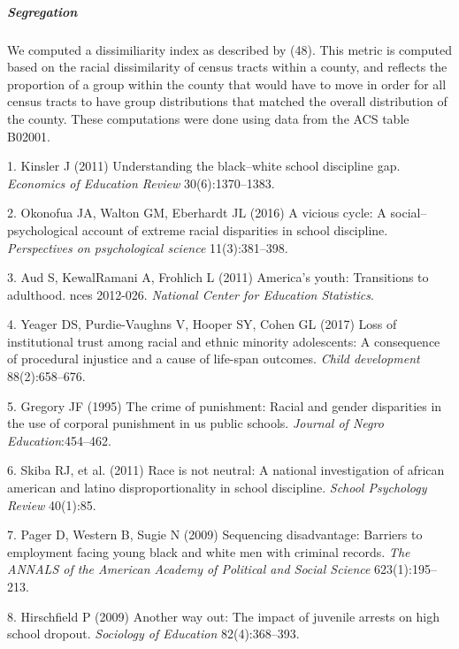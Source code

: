 \documentclass[9pt,twocolumn,twoside,lineno]{pnas-new}
\begin{document}
\subparagraph{Segregation}\label{segregation}

We computed a dissimiliarity index as described by (48). This metric is
computed based on the racial dissimilarity of census tracts within a
county, and reflects the proportion of a group within the county that
would have to move in order for all census tracts to have group
distributions that matched the overall distribution of the county. These
computations were done using data from the ACS table B02001.

\showmatmethods
\showacknow
\pnasbreak

\hypertarget{refs}{}
\hypertarget{ref-kinsler2011understanding}{}
1. Kinsler J (2011) Understanding the black--white school discipline
gap. \emph{Economics of Education Review} 30(6):1370--1383.

\hypertarget{ref-okonofua2016vicious}{}
2. Okonofua JA, Walton GM, Eberhardt JL (2016) A vicious cycle: A
social--psychological account of extreme racial disparities in school
discipline. \emph{Perspectives on psychological science} 11(3):381--398.

\hypertarget{ref-aud2011america}{}
3. Aud S, KewalRamani A, Frohlich L (2011) America's youth: Transitions
to adulthood. nces 2012-026. \emph{National Center for Education
Statistics}.

\hypertarget{ref-yeager2017loss}{}
4. Yeager DS, Purdie-Vaughns V, Hooper SY, Cohen GL (2017) Loss of
institutional trust among racial and ethnic minority adolescents: A
consequence of procedural injustice and a cause of life-span outcomes.
\emph{Child development} 88(2):658--676.

\hypertarget{ref-gregory1995crime}{}
5. Gregory JF (1995) The crime of punishment: Racial and gender
disparities in the use of corporal punishment in us public schools.
\emph{Journal of Negro Education}:454--462.

\hypertarget{ref-skiba2011race}{}
6. Skiba RJ, et al. (2011) Race is not neutral: A national investigation
of african american and latino disproportionality in school discipline.
\emph{School Psychology Review} 40(1):85.

\hypertarget{ref-pager2009sequencing}{}
7. Pager D, Western B, Sugie N (2009) Sequencing disadvantage: Barriers
to employment facing young black and white men with criminal records.
\emph{The ANNALS of the American Academy of Political and Social
Science} 623(1):195--213.

\hypertarget{ref-hirschfield2009another}{}
8. Hirschfield P (2009) Another way out: The impact of juvenile arrests
on high school dropout. \emph{Sociology of Education} 82(4):368--393.
\end{document}

